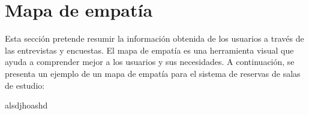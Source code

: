 \documentclass{article}
\begin{document}
\newpage

\section{Mapa de empatía}

Esta sección pretende resumir la información obtenida de los usuarios a través de las entrevistas y encuestas. El mapa de empatía es una herramienta visual que ayuda a comprender mejor a los usuarios y sus necesidades. A continuación, se presenta un ejemplo de un mapa de empatía para el sistema de reservas de salas de estudio:

alsdjhoashd
\end{document}

